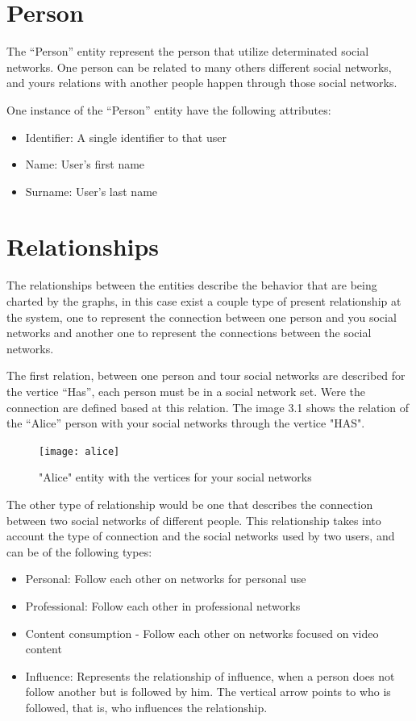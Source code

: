 \section{Person}

The “Person” entity represent the person that utilize determinated social networks. One person can be related to many others different social networks, and yours relations with another people happen through those social networks. 

One instance of the “Person” entity have the following attributes:

\begin{itemize}
\item Identifier: A single identifier to that user
\item Name: User’s first name
\item Surname: User’s last name
\end{itemize}


\section{Relationships}


The relationships between the entities describe the behavior that are being charted by the graphs, in this case exist a couple type of present relationship at the system, one to represent the connection between one person and you social networks and another one to represent the connections between the social networks.

The first relation, between one person and tour social networks are described for the vertice “Has”, each person must be in a social network set. Were the connection are defined based at this relation. The image 3.1 shows the relation of the “Alice” person with your social networks through the vertice "HAS".  

\begin{figure}
    \centering
    \texttt{[image: alice]}
    \caption{"Alice" entity with the vertices for your social networks}
    \label{fig:my_label}
\end{figure}



The other type of relationship would be one that describes the connection between two social networks of different people. This relationship takes into account the type of connection and the social networks used by two users, and can be of the following types:

\begin{itemize}
    \item Personal: Follow each other on networks for personal use
    \item Professional: Follow each other in professional networks
    \item Content consumption - Follow each other on networks focused on video content
    \item Influence: Represents the relationship of influence, when a person does not follow another but is followed by him. The vertical arrow points to who is followed, that is, who influences the relationship.
\end{itemize}



